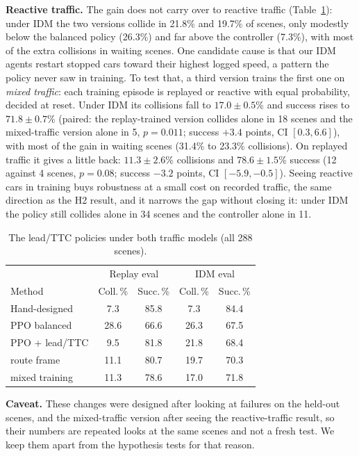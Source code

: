 \documentclass[conference]{IEEEtran}
\newcommand{\pp}{\phantom{0}}
\begin{document}
\textbf{Reactive traffic.} The gain does not carry over to reactive traffic
(Table~\ref{tab:mixed}): under IDM the two versions collide in 21.8\% and 19.7\% of scenes,
only modestly below the balanced policy (26.3\%) and far above the controller (7.3\%),
with most of the extra collisions in waiting scenes. One candidate cause is that our IDM
agents restart stopped cars toward their highest logged speed, a pattern the policy
never saw in training. To test that, a third version trains the first one on
\emph{mixed traffic}: each training episode is replayed or reactive with equal
probability, decided at reset. Under IDM its collisions fall to $17.0\pm0.5$\% and success
rises to $71.8\pm0.7$\% (paired: the replay-trained version collides alone in 18 scenes and the mixed-traffic version alone in 5, $p=0.011$; success $+3.4$ points, CI $[0.3, 6.6]$), with most
of the gain in waiting scenes (31.4\% to 23.3\% collisions). On replayed traffic it gives
a little back: $11.3\pm2.6$\% collisions and $78.6\pm1.5$\% success (12 against 4 scenes,
$p=0.08$; success $-3.2$ points, CI $[-5.9,-0.5]$). Seeing reactive cars in training buys
robustness at a small cost on recorded traffic, the same direction as the H2 result, and it narrows the gap without closing it: under IDM the policy still collides alone in 34 scenes and the controller alone in 11.

\begin{table}[t]
\caption{The lead/TTC policies under both traffic models (all 288 scenes).}\label{tab:mixed}
\centering\small
\begin{tabular}{@{}lcccc@{}}
\toprule
 & \multicolumn{2}{c}{Replay eval} & \multicolumn{2}{c}{IDM eval} \\
Method & Coll.\,\% & Succ.\,\% & Coll.\,\% & Succ.\,\% \\
\midrule
Hand-designed & \pp7.3 & 85.8 & \pp7.3 & 84.4 \\
PPO balanced & 28.6 & 66.6 & 26.3 & 67.5 \\
PPO + lead/TTC & \pp9.5 & 81.8 & 21.8 & 68.4 \\
\quad route frame & 11.1 & 80.7 & 19.7 & 70.3 \\
\quad mixed training & 11.3 & 78.6 & 17.0 & 71.8 \\
\bottomrule
\end{tabular}
\end{table}

\textbf{Caveat.} These changes were designed after looking at failures on the held-out
scenes, and the mixed-traffic version after seeing the reactive-traffic result, so their
numbers are repeated looks at the same scenes and not a fresh test. We keep them apart
from the hypothesis tests for that reason.
\end{document}
